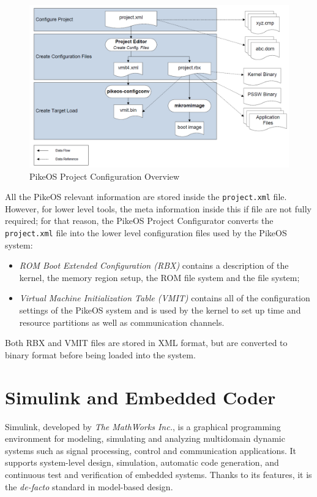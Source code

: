 \begin{figure}[htbp] 
\centering    
\includegraphics[width=1.0\textwidth]{PikeosProjectConfiguration}
\caption{PikeOS Project Configuration Overview}
\label{fig:PikeosProjectConfiguration}
\end{figure}

All the PikeOS relevant information are stored inside the \verb|project.xml| file. However, for lower level tools, the meta information inside this if file are not fully required; for that reason, the PikeOS Project Configurator converts the \verb|project.xml| file into the lower level configuration files used by the PikeOS system:
\begin{itemize}
\item \emph{ROM Boot Extended Configuration (RBX)} contains a description of the kernel, the memory region setup, the ROM file system and the file system;
\item \emph{Virtual Machine Initialization Table (VMIT)} contains all of the configuration settings of the PikeOS system and is used by the kernel to set up time and resource partitions as well as communication channels.
\end{itemize}
Both RBX and VMIT files are stored in XML format, but are converted to binary format before being loaded into the system.


\section{Simulink and Embedded Coder}
Simulink\textregistered \cite{Simulink}, developed by \emph{The MathWorks Inc.}, is a graphical programming environment for modeling, simulating and analyzing multidomain dynamic systems such as signal processing, control and communication applications. It supports system-level design, simulation, automatic code generation, and continuous test and verification of embedded systems. Thanks to its features, it is the \emph{de-facto} standard in model-based design.

